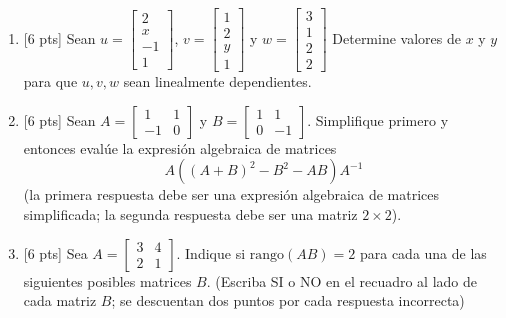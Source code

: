\documentclass[11pt]{article}
\begin{document}
\begin{enumerate}
\item{}[6 pts] Sean $u = \begin{bmatrix}2\\x\\-1\\1\end{bmatrix}$, $v = \begin{bmatrix}1\\2\\y\\1\end{bmatrix}$ y $w = \begin{bmatrix}3\\1\\2\\2\end{bmatrix}$ Determine valores de $x$ y $y$ para que $u,v,w$ sean linealmente dependientes.

\vspace{4pt}

\item{}[6 pts] Sean $A = \begin{bmatrix}1 & 1\\ -1 & 0\end{bmatrix}$ y $B = \begin{bmatrix}1 & 1\\ 0 & -1\end{bmatrix}$. Simplifique primero y entonces evalúe la expresión algebraica de matrices
\[
A((A+B)^2 - B^2 - AB)A^{-1}
\]
(la primera respuesta debe ser una expresión algebraica de matrices simplificada; la segunda respuesta debe ser una matriz $2\times 2$).

\vspace{4pt}

\item{}[6 pts] Sea $A = \begin{bmatrix}3 & 4\\ 2 & 1\end{bmatrix}$. Indique si $\mathrm{rango}(AB)=2$ para cada una de las siguientes posibles matrices $B$. (Escriba SI o NO en el recuadro al lado de cada matriz $B$; se descuentan dos puntos por cada respuesta incorrecta)


\end{enumerate}
\end{document}
